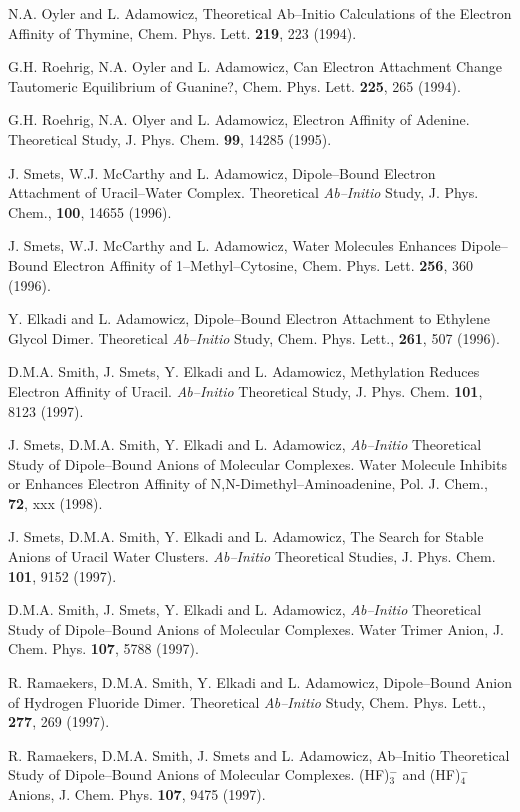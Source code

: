 \begin{thebibliography}{999}
N.A. Oyler and L. Adamowicz, Theoretical Ab--Initio
Calculations of the Electron Affinity of 
Thymine, Chem. Phys. Lett. {\bf 219}, 223 (1994).


G.H. Roehrig, N.A. Oyler and L. Adamowicz, 
Can Electron Attachment Change Tautomeric
Equilibrium of Guanine?, Chem. Phys. Lett. {\bf 225}, 265 (1994).


G.H. Roehrig, N.A. Olyer
and L. Adamowicz, Electron Affinity of Adenine.  
Theoretical Study, J. Phys. Chem. {\bf 99},
14285 (1995). 


J. Smets, W.J. McCarthy and 
L. Adamowicz, Dipole--Bound Electron
Attachment of Uracil--Water Complex.  Theoretical 
{\it Ab--Initio} Study, 
J. Phys. Chem., {\bf 100}, 14655 (1996).

J. Smets, 
W.J. McCarthy and L. Adamowicz, Water Molecules
Enhances Dipole--Bound Electron Affinity of 1--Methyl--Cytosine, 
Chem. Phys. Lett. {\bf 256}, 360 (1996).

Y. Elkadi and L. Adamowicz, 
Dipole--Bound Electron Attachment
to Ethylene  Glycol Dimer.  Theoretical {\it Ab--Initio} 
Study, Chem. Phys. Lett., {\bf 261}, 507 (1996).

D.M.A. Smith, J. Smets, Y. Elkadi and 
L. Adamowicz, Methylation Reduces
Electron Affinity of Uracil.  {\it Ab--Initio} 
Theoretical Study, J. Phys. Chem.
{\bf 101}, 8123 (1997).

J. Smets, D.M.A. Smith, Y. Elkadi 
and L. Adamowicz, {\it Ab--Initio} Theoretical Study
of Dipole--Bound Anions of Molecular 
Complexes.  Water Molecule Inhibits or
Enhances Electron Affinity of N,N-Dimethyl--Aminoadenine, 
Pol. J. Chem., {\bf 72}, xxx (1998). 

J. Smets, D.M.A. Smith, Y. Elkadi and 
L. Adamowicz, The Search for Stable
Anions of Uracil Water Clusters.  {\it Ab--Initio} 
Theoretical Studies, J. Phys. Chem.
{\bf 101}, 9152 (1997).

D.M.A. Smith, J. Smets, Y. Elkadi and 
L. Adamowicz, {\it Ab--Initio} Theoretical Study
of Dipole--Bound Anions of Molecular 
Complexes.  Water Trimer Anion, J. Chem.
Phys.
{\bf 107}, 5788 (1997).

R. Ramaekers, D.M.A. Smith, Y. Elkadi and 
L. Adamowicz, Dipole--Bound Anion
of Hydrogen Fluoride Dimer.  Theoretical 
{\it Ab--Initio} Study, Chem. Phys. Lett.,
{\bf 277}, 269 (1997).

R. Ramaekers, D.M.A. Smith, J. Smets 
and L. Adamowicz, Ab--Initio Theoretical
Study of Dipole--Bound Anions of Molecular 
Complexes. (HF)$_3^-$ and (HF)$_4^-$ Anions,
J. Chem. Phys.
{\bf 107}, 9475 (1997).


\end{thebibliography}
